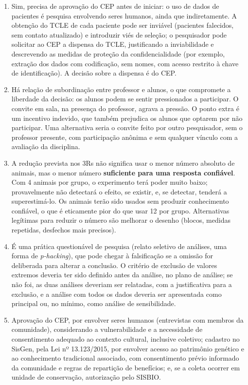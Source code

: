 \documentclass[
]{book}
\begin{document}
\begin{enumerate}
\def\labelenumi{\arabic{enumi}.}
\item
  Sim, precisa de aprovação do CEP antes de iniciar: o uso de dados de pacientes é pesquisa envolvendo seres humanos, ainda que indiretamente. A obtenção do TCLE de cada paciente pode ser inviável (pacientes falecidos, sem contato atualizado) e introduzir viés de seleção; o pesquisador pode solicitar ao CEP a dispensa do TCLE, justificando a inviabilidade e descrevendo as medidas de proteção da confidencialidade (por exemplo, extração dos dados com codificação, sem nomes, com acesso restrito à chave de identificação). A decisão sobre a dispensa é do CEP.
\item
  Há relação de subordinação entre professor e alunos, o que compromete a liberdade da decisão: os alunos podem se sentir pressionados a participar. O convite em sala, na presença do professor, agrava a pressão. O ponto extra é um incentivo indevido, que também prejudica os alunos que optarem por não participar. Uma alternativa seria o convite feito por outro pesquisador, sem o professor presente, com participação anônima e sem qualquer vínculo com a avaliação da disciplina.
\item
  A redução prevista nos 3Rs não significa usar o menor número absoluto de animais, mas o menor número \textbf{suficiente para uma resposta confiável}. Com 4 animais por grupo, o experimento terá poder muito baixo; provavelmente não detectará o efeito, se existir, e, se detectar, tenderá a superestimá-lo. Os animais terão sido usados sem produzir conhecimento confiável, o que é eticamente pior do que usar 12 por grupo. Alternativas legítimas para reduzir o número são melhorar o desenho (blocos, medidas repetidas, desfechos mais precisos).
\item
  É uma prática questionável de pesquisa (relato seletivo de análises, uma forma de \emph{p-hacking}), que pode chegar à falsificação se a omissão for deliberada para alterar a conclusão. O critério de exclusão de valores extremos deveria ter sido definido antes da análise, no plano de análise; se não foi, as duas análises deveriam ser relatadas, com a justificativa para a exclusão, e a análise com todos os dados deveria ser apresentada como principal ou, no mínimo, como análise de sensibilidade.
\item
  Aprovação do CEP, por envolver seres humanos (entrevistas com membros da comunidade), considerando a vulnerabilidade e a necessidade de consentimento adequado ao contexto cultural, inclusive coletivo; cadastro no SisGen, pela Lei nº 13.123/2015, por envolver acesso ao patrimônio genético e ao conhecimento tradicional associado, com consentimento prévio informado da comunidade e regras de repartição de benefícios; e, se a coleta ocorrer em unidade de conservação, autorização pelo SISBIO.
\end{enumerate}
\end{document}
